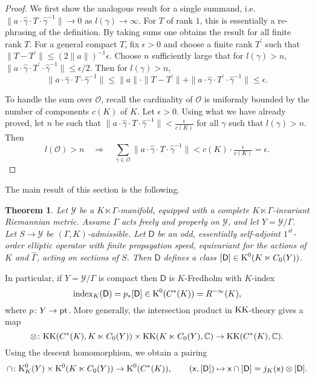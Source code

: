 \documentclass[11pt,reqno]{amsart}
\newtheorem{theorem}{Theorem}[section]
\theoremstyle{definition}
\theoremstyle{remark}
\newcommand{\wh}[1]{\widehat{#1}}
\newcommand{\st}[1]{\mathsf{#1}}
\def\O{\ensuremath{\mathcal{O}}}
\def\Y{\ensuremath{\mathcal{Y}}}
\def\K{\ensuremath{\mathcal{K}}}
\def\O{\ensuremath{\mathcal{O}}}
\def\bC{\ensuremath{\mathbb{C}}}
\def\.{\ensuremath{\cdot}}
\def\index{\ensuremath{\textnormal{index}}}
\def\KK{\ensuremath{\textnormal{KK}}}
\def\pt{\ensuremath{\textnormal{pt}}}
\def\K{\ensuremath{\textnormal{K}}}
\def\hgamma{\ensuremath{\widehat{\gamma}}}
\begin{document}
%
\begin{proof}
We first show the analogous result for a single summand, i.e. $\|a\.\hgamma \. T\. \hgamma^{-1}\| \rightarrow 0$ as $l(\gamma) \rightarrow \infty$.  For $T$ of rank $1$, this is essentially a re-phrasing of the definition.   By taking sums one obtains the result for all finite rank $T$.  For a general compact $T$, fix $\epsilon >0$ and choose a finite rank $T^\prime$ such that $\|T-T^\prime\| \le (2\|a\|)^{-1}\epsilon$.  Choose $n$ sufficiently large that for $l(\gamma)>n$, $\|a\.\wh{\gamma}\.T^\prime \. \wh{\gamma}^{-1}\| \le \epsilon/2$.  Then for $l(\gamma)>n$,
\[ \|a\.\wh{\gamma}\.T\. \wh{\gamma}^{-1}\| \le \|a\|\.\|T-T^\prime\|+\|a\.\wh{\gamma}\.T^\prime\.\wh{\gamma}^{-1}\| \le \epsilon.\]

To handle the sum over $\O$, recall the cardinality of $\O$ is uniformly bounded by the number of components $c(K)$ of $K$.  Let $\epsilon >0$.  Using what we have already proved, let $n$ be such that $\|a\.\hgamma \.T \.\hgamma^{-1}\|<\tfrac{\epsilon}{c(K)}$ for all $\gamma$ such that $l(\gamma)>n$.  Then
\[ l(\O)>n \quad \Rightarrow \quad \sum_{\gamma \in \O}\|a\.\hgamma\. T \.\hgamma^{-1}\|<c(K)\cdot \tfrac{\epsilon}{c(K)}=\epsilon.\]
\end{proof}
The main result of this section is the following.
\begin{theorem}
\label{thm:GammaKAdmissible}
Let $\Y$ be a $K\ltimes \Gamma$-manifold, equipped with a complete $K\ltimes \Gamma$-invariant Riemannian metric.  Assume $\Gamma$ acts freely and properly on $\Y$, and let $Y=\Y/\Gamma$.  Let $S \rightarrow \Y$ be $(\Gamma,K)$-admissible.  Let $\st{D}$ be an odd, essentially self-adjoint $1^{st}$-order elliptic operator with finite propagation speed, equivariant for the actions of $K$ and $\wh{\Gamma}$, acting on sections of $S$.  Then $\st{D}$ defines a class $[\st{D}] \in \K^0(K \ltimes C_0(Y))$.
\end{theorem}
In particular, if $Y=\Y/\Gamma$ is compact then $\st{D}$ is $K$-Fredholm with $K$-index
\[ \index_K(\st{D})=p_\ast [\st{D}] \in \K^0(C^\ast(K))=R^{-\infty}(K),\]
where $p\colon Y \rightarrow \pt$.  More generally, the intersection product in $\KK$-theory gives a map
\begin{equation} 
\label{CapProduct}
\otimes \colon \KK(C^\ast(K),K \ltimes C_0(Y)) \times \KK(K\ltimes C_0(Y),\bC) \rightarrow \KK(C^\ast(K),\bC).
\end{equation}
Using the descent homomorphism, we obtain a pairing
\begin{equation}
\label{eqn:CapProduct2} 
\cap \colon \K^0_K(Y) \times \K^0(K\ltimes C_0(Y)) \rightarrow \K^0(C^\ast(K)), \qquad (\st{x},[\st{D}]) \mapsto \st{x} \cap [\st{D}]=j_K(\st{x})\otimes [\st{D}].
\end{equation}
\end{document}
